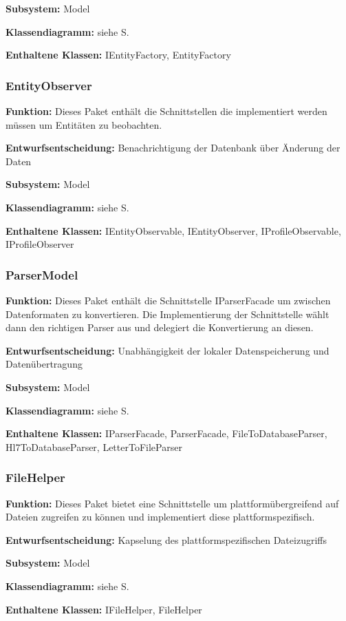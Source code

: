 \documentclass[a4paper]{scrreprt}
\begin{document}
\textbf{Subsystem:} Model

\textbf{Klassendiagramm:} siehe S.

\textbf{Enthaltene Klassen:} IEntityFactory, EntityFactory

\subsubsection{EntityObserver}
\textbf{Funktion:} Dieses Paket enthält die Schnittstellen die implementiert werden müssen um Entitäten zu beobachten.

\textbf{Entwurfsentscheidung:} Benachrichtigung der Datenbank über Änderung der Daten

\textbf{Subsystem:} Model

\textbf{Klassendiagramm:} siehe S.

\textbf{Enthaltene Klassen:} IEntityObservable, IEntityObserver, IProfileObservable, IProfileObserver

\subsubsection{ParserModel}
\textbf{Funktion:} Dieses Paket enthält die Schnittstelle IParserFacade um zwischen Datenformaten zu konvertieren.
Die Implementierung der Schnittstelle wählt dann den richtigen Parser aus und delegiert die Konvertierung an diesen.

\textbf{Entwurfsentscheidung:} Unabhängigkeit der lokaler Datenspeicherung und Datenübertragung

\textbf{Subsystem:} Model

\textbf{Klassendiagramm:} siehe S.

\textbf{Enthaltene Klassen:} IParserFacade, ParserFacade, FileToDatabaseParser, Hl7ToDatabaseParser, LetterToFileParser

\subsubsection{FileHelper}
\textbf{Funktion:} Dieses Paket bietet eine Schnittstelle um plattformübergreifend auf Dateien zugreifen zu können und implementiert diese plattformspezifisch.

\textbf{Entwurfsentscheidung:} Kapselung des plattformspezifischen Dateizugriffs

\textbf{Subsystem:} Model

\textbf{Klassendiagramm:} siehe S.

\textbf{Enthaltene Klassen:} IFileHelper, FileHelper
\end{document}
